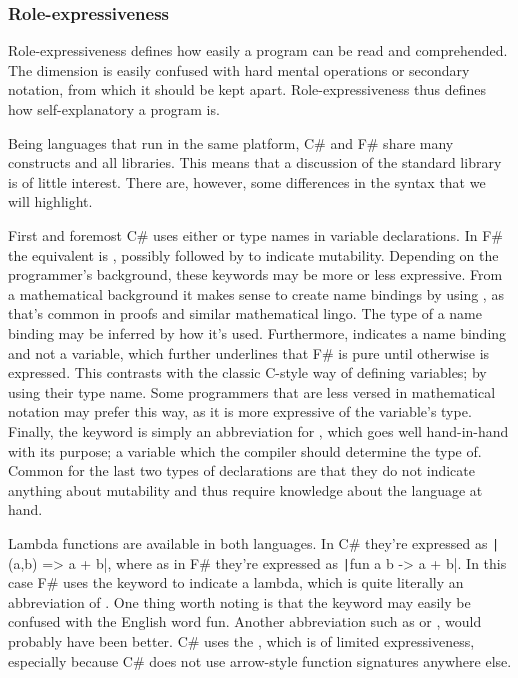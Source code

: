 \subsubsection{Role-expressiveness}
Role-expressiveness defines how easily a program can be read and comprehended. The dimension is easily confused with hard mental operations or secondary notation, from which it should be kept apart\cite{green1996usability}. Role-expressiveness thus defines how self-explanatory a program is.

Being languages that run in the same platform, C\# and F\# share many constructs and all libraries. This means that a discussion of the standard library is of little interest. There are, however, some differences in the syntax that we will highlight. 

First and foremost C\# uses either  or type names in variable declarations. In F\# the equivalent is , possibly followed by  to indicate mutability. Depending on the programmer's background, these keywords may be more or less expressive. From a mathematical background it makes sense to create name bindings by using , as that's common in proofs and similar mathematical lingo. The type of a name binding may be inferred by how it's used. Furthermore,  indicates a name binding and not a variable, which further underlines that F\# is pure until otherwise is expressed. This contrasts with the classic C-style way of defining variables; by using their type name. Some programmers that are less versed in mathematical notation may prefer this way, as it is more expressive of the variable's type. Finally, the  keyword is simply an abbreviation for , which goes well hand-in-hand with its purpose; a variable which the compiler should determine the type of. Common for the last two types of declarations are that they do not indicate anything about mutability and thus require knowledge about the language at hand.

Lambda functions are available in both languages. In C\# they're expressed as \texttt|(a,b) => a + b|, where as in F\# they're expressed as \texttt|fun a b -> a + b|. In this case F\# uses the keyword  to indicate a lambda, which is quite literally an abbreviation of . One thing worth noting is that the  keyword may easily be confused with the English word fun. Another abbreviation such as  or , would probably have been better. C\# uses the \ttt{=\textgreater}, which is of limited expressiveness, especially because C\# does not use arrow-style function signatures anywhere else.


